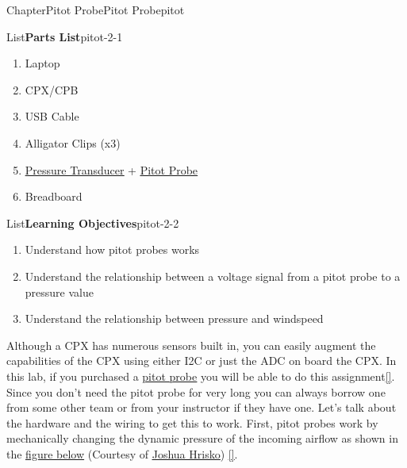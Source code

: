 \documentclass[oneside,10pt,]{book}
\newcommand{\xreffont}{\relax}
\newcommand{\linkhilite}[1]{\underline{#1}}
\numberwithin{equation}{section}
\begin{document}
\begin{chapterptx}{Chapter}{Pitot Probe}{}{Pitot Probe}{}{}{pitot}
\renewcommand*{\chaptername}{Chapter}
\begin{introduction}{}%
\begin{listptx}{List}{\textbf{Parts List}}{pitot-2-1}{}%
%
\begin{enumerate}
\item{}Laptop%
\item{}CPX\slash{}CPB%
\item{}USB Cable%
\item{}Alligator Clips (x3)%
\item{}\href{https://www.amazon.com/Pressure-MPXV7002DP-Breakout-Transducer-Components/dp/B08C5CF7CB}{\linkhilite{Pressure Transducer}} + \href{https://www.amazon.com/Jadeshay-Differential-Speedometer-Precision-Instrument/dp/B07Q6126B6/ref=pd_bxgy_thbs_d_sccl_1/131-3143700-2176464?pd_rd_w=7zZaR\&content-id=amzn1.sym.9bef5913-5870-4504-8883-3ba89d7f8e39\&pf_rd_p=9bef5913-5870-4504-8883-3ba89d7f8e39\&pf_rd_r=KSZ04S642T1YZ2QXTHWK\&pd_rd_wg=MrPsd\&pd_rd_r=63018516-b34d-43f9-9369-36d494eda7a3\&pd_rd_i=B07Q6126B6\&psc=1}{\linkhilite{Pitot Probe}}%
\item{}Breadboard%
\end{enumerate}
\end{listptx}%
\begin{listptx}{List}{\textbf{Learning Objectives}}{pitot-2-2}{}%
%
\begin{enumerate}
\item{}Understand how pitot probes works%
\item{}Understand the relationship between a voltage signal from a pitot probe to a pressure value%
\item{}Understand the relationship between pressure and windspeed%
\end{enumerate}
\end{listptx}%
Although a CPX has numerous sensors built in, you can easily augment the capabilities of the CPX using either I2C or just the ADC on board the CPX. In this lab, if you purchased a \href{https://www.amazon.com/Hobbypower-Airspeed-MPXV7002DP-Differential-controller/dp/B00WSFWO36/ref=sr_1_3?dchild=1\&keywords=Airspeed+sensor+kit\&qid=1590532161\&sr=8-3}{\linkhilite{pitot probe}} you will be able to do this assignment\hyperlink{pitot-amazon}{\linkhilite{[{\xreffont 40}]}}. Since you don't need the pitot probe for very long you can always borrow one from some other team or from your instructor if they have one. Let's talk about the hardware and the wiring to get this to work. First, pitot probes work by mechanically changing the dynamic pressure of the incoming airflow as shown in the \href{https://makersportal.com/blog/2019/02/06/arduino-pitot-tube-wind-speed-theory-and-experiment}{\linkhilite{figure below}} (Courtesy of \href{https://makersportal.com/blog?author=59b036fc6073554c1cfffef7}{\linkhilite{Joshua Hrisko}}) \hyperlink{pitot-author}{\linkhilite{[{\xreffont 39}]}}.%

\end{introduction}
\end{chapterptx}
\end{document}
